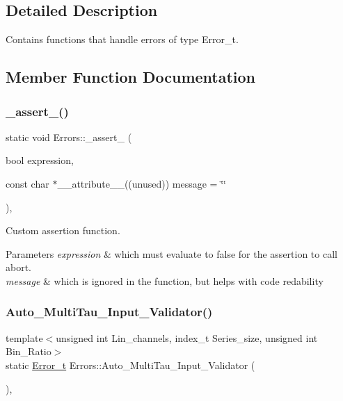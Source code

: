 \subsection{Detailed Description}
Contains functions that handle errors of type {\ttfamily Error\+\_\+t}. 

\subsection{Member Function Documentation}
\mbox{\label{classErrors_a3618ed0e7aba69be0759fa821a987b3b}} 
\subsubsection{\texorpdfstring{\+\_\+assert\+\_\+()}{\_assert\_()}}
{\footnotesize\ttfamily static void Errors\+::\+\_\+assert\+\_\+ (\begin{DoxyParamCaption}\item[{bool}]{expression,  }\item[{const char $\ast$\+\_\+\+\_\+attribute\+\_\+\+\_\+((unused))}]{message = {\ttfamily \char`\"{}\char`\"{}} }\end{DoxyParamCaption})\hspace{0.3cm}{\ttfamily [inline]}, {\ttfamily [static]}}



Custom assertion function. 


\begin{DoxyParams}{Parameters}
{\em expression} & which must evaluate to false for the assertion to call abort. \\
\hline
{\em message} & which is ignored in the function, but helps with code redability \\
\hline
\end{DoxyParams}
\mbox{\label{classErrors_a8578169dc7b56d2080f07a0647f627e1}} 
\subsubsection{\texorpdfstring{Auto\+\_\+\+Multi\+Tau\+\_\+\+Input\+\_\+\+Validator()}{Auto\_MultiTau\_Input\_Validator()}}
{\footnotesize\ttfamily template$<$unsigned int Lin\+\_\+channels, index\+\_\+t Series\+\_\+size, unsigned int Bin\+\_\+\+Ratio$>$ \\
static \hyperlink{errors_8hpp_a4e8c0d09726859e3d3369c0da5a1aa7f}{Error\+\_\+t} Errors\+::\+Auto\+\_\+\+Multi\+Tau\+\_\+\+Input\+\_\+\+Validator (\begin{DoxyParamCaption}{ }\end{DoxyParamCaption})\hspace{0.3cm}{\ttfamily [inline]}, {\ttfamily [static]}}



